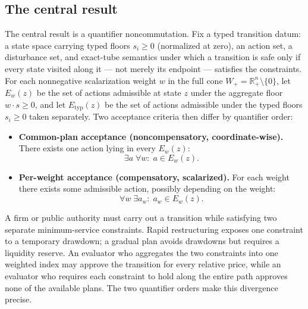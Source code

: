 \documentclass[review,11pt]{elsarticle}
\providecommand{\tightlist}{\setlength{\itemsep}{0pt}\setlength{\parskip}{0pt}}
\begin{document}
\subsection{The central result}\label{the-central-result}

The central result is a quantifier noncommutation. Fix a
typed transition datum: a state space carrying typed floors
\(s_i \ge 0\) (normalized at zero), an action set, a disturbance set,
and exact-tube semantics under which a transition is safe only if every
state visited along it --- not merely its endpoint --- satisfies the
constraints. For each nonnegative scalarization weight \(w\) in the full
cone \(W_+ = \mathbb{R}^n_+ \setminus \{0\}\), let \(E_w(z)\) be the set
of actions admissible at state \(z\) under the aggregate floor
\(w \cdot s \ge 0\), and let \(E_{\mathrm{typ}}(z)\) be the set of
actions admissible under the typed floors \(s_i \ge 0\) taken
separately. Two acceptance criteria then differ by quantifier order:

\begin{itemize}
\tightlist
\item
  \textbf{Common-plan acceptance (noncompensatory, coordinate-wise).} There exists one
  action lying in every \(E_w(z)\):
  \[\exists a\; \forall w:\; a \in E_w(z).\]
\item
  \textbf{Per-weight acceptance (compensatory, scalarized).} For each weight there
  exists some admissible action, possibly depending on the weight:
  \[\forall w\; \exists a_w:\; a_w \in E_w(z).\]
\end{itemize}

A firm or public authority must carry out a transition while satisfying
two separate minimum-service constraints. Rapid restructuring exposes one
constraint to a temporary drawdown; a gradual plan avoids drawdowns but
requires a liquidity reserve. An evaluator who aggregates the two
constraints into one weighted index may approve the transition for every
relative price, while an evaluator who requires each constraint to hold
along the entire path approves none of the available plans. The
two quantifier orders make this divergence precise.
\end{document}

